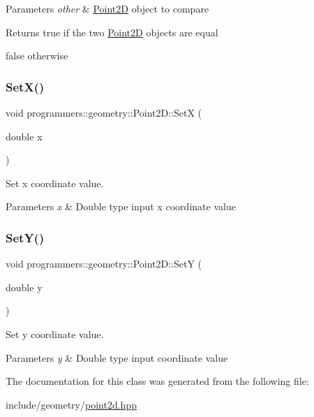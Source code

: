 \begin{DoxyParams}{Parameters}
{\em other} & \hyperlink{classprogrammers_1_1geometry_1_1Point2D}{Point2D} object to compare \\
\hline
\end{DoxyParams}
\begin{DoxyReturn}{Returns}
true if the two \hyperlink{classprogrammers_1_1geometry_1_1Point2D}{Point2D} objects are equal 

false otherwise 
\end{DoxyReturn}
\mbox{\label{classprogrammers_1_1geometry_1_1Point2D_ac9bf761fd09d5c29459db2b2aa3379e1}} 
\subsubsection{\texorpdfstring{Set\+X()}{SetX()}}
{\footnotesize\ttfamily void programmers\+::geometry\+::\+Point2\+D\+::\+SetX (\begin{DoxyParamCaption}\item[{double}]{x }\end{DoxyParamCaption})}



Set x coordinate value. 


\begin{DoxyParams}{Parameters}
{\em x} & Double type input x coordinate value \\
\hline
\end{DoxyParams}
\mbox{\label{classprogrammers_1_1geometry_1_1Point2D_aacd2306ed57634d39f22c41f760d95a4}} 
\subsubsection{\texorpdfstring{Set\+Y()}{SetY()}}
{\footnotesize\ttfamily void programmers\+::geometry\+::\+Point2\+D\+::\+SetY (\begin{DoxyParamCaption}\item[{double}]{y }\end{DoxyParamCaption})}



Set y coordinate value. 


\begin{DoxyParams}{Parameters}
{\em y} & Double type input coordinate value \\
\hline
\end{DoxyParams}


The documentation for this class was generated from the following file\+:\begin{DoxyCompactItemize}
\item 
include/geometry/\hyperlink{point2d_8hpp}{point2d.\+hpp}\end{DoxyCompactItemize}
